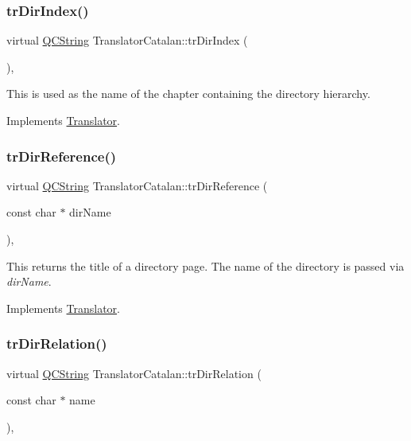 \subsubsection{\texorpdfstring{trDirIndex()}{trDirIndex()}}
{\footnotesize\ttfamily virtual \mbox{\hyperlink{class_q_c_string}{Q\+C\+String}} Translator\+Catalan\+::tr\+Dir\+Index (\begin{DoxyParamCaption}{ }\end{DoxyParamCaption})\hspace{0.3cm}{\ttfamily [inline]}, {\ttfamily [virtual]}}

This is used as the name of the chapter containing the directory hierarchy. 

Implements \mbox{\hyperlink{class_translator}{Translator}}.

\mbox{\label{class_translator_catalan_a62dbe27fe3fe80ceae930faaddfd573c}} 
\subsubsection{\texorpdfstring{trDirReference()}{trDirReference()}}
{\footnotesize\ttfamily virtual \mbox{\hyperlink{class_q_c_string}{Q\+C\+String}} Translator\+Catalan\+::tr\+Dir\+Reference (\begin{DoxyParamCaption}\item[{const char $\ast$}]{dir\+Name }\end{DoxyParamCaption})\hspace{0.3cm}{\ttfamily [inline]}, {\ttfamily [virtual]}}

This returns the title of a directory page. The name of the directory is passed via {\itshape dir\+Name}. 

Implements \mbox{\hyperlink{class_translator}{Translator}}.

\mbox{\label{class_translator_catalan_a4816d9fd00b451a7f8b12dbca18968b8}} 
\subsubsection{\texorpdfstring{trDirRelation()}{trDirRelation()}}
{\footnotesize\ttfamily virtual \mbox{\hyperlink{class_q_c_string}{Q\+C\+String}} Translator\+Catalan\+::tr\+Dir\+Relation (\begin{DoxyParamCaption}\item[{const char $\ast$}]{name }\end{DoxyParamCaption})\hspace{0.3cm}{\ttfamily [inline]}, {\ttfamily [virtual]}}

